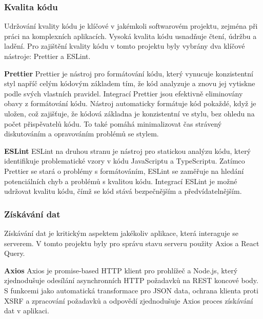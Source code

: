 \subsubsection{Kvalita kódu}
\label{sec:implementace-techologie-ostatni-kvalita}
Udržování kvality kódu je klíčové v jakémkoli softwarovém projektu, zejména při práci na komplexních aplikacích.
Vysoká kvalita kódu usnadňuje čtení, údržbu a ladění.
Pro zajištění kvality kódu v tomto projektu byly vybrány dva klíčové nástroje: Prettier a ESLint.

\textbf{Prettier}
Prettier je nástroj pro formátování kódu, který vynucuje konzistentní styl napříč celým kódovým základem tím, že kód analyzuje a znovu jej vytiskne podle svých vlastních pravidel.
Integrací Prettier jsou efektivně eliminovány obavy z formátování kódu.
Nástroj automaticky formátuje kód pokaždé, když je uložen, což zajišťuje, že kódová základna je konzistentní ve stylu, bez ohledu na počet přispěvatelů kódu.
To také pomáhá minimalizovat čas strávený diskutováním a opravováním problémů se stylem.

\textbf{ESLint}
ESLint na druhou stranu je nástroj pro statickou analýzu kódu, který identifikuje problematické vzory v kódu JavaScriptu a TypeScriptu.
Zatímco Prettier se stará o problémy s formátováním, ESLint se zaměřuje na hledání potenciálních chyb a problémů s kvalitou kódu.
Integrací ESLint je možné udržovat kvalitu kódu, čímž se kód stává bezpečnějším a předvídatelnějším.

\subsubsection{Získávání dat}
\label{sec:implementace-techologie-ostatni-ziskavani}
Získávání dat je kritickým aspektem jakékoliv aplikace, která interaguje se serverem.
V tomto projektu byly pro správu stavu serveru použity Axios a React Query.

\textbf{Axios}
Axios je promise-based HTTP klient pro prohlížeč a Node.js, který zjednodušuje odesílání asynchronních HTTP požadavků na REST koncové body.
S funkcemi jako automatická transformace pro JSON data, ochrana klienta proti XSRF a zpracování požadavků a odpovědí zjednodušuje Axios proces získávání dat v aplikaci.

